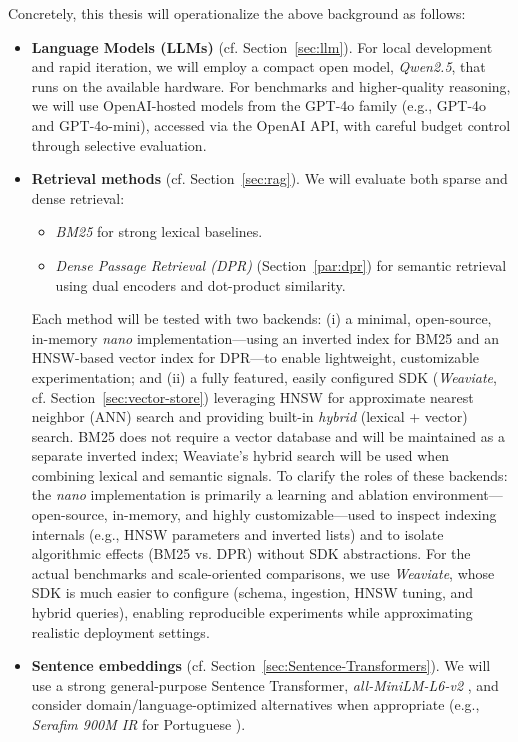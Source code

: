 Concretely, this thesis will operationalize the above background as follows:
\begin{itemize}
    \item \textbf{Language Models (\glspl{LLM})} (cf. Section~\ref{sec:llm}). For local development and rapid iteration, we will employ a compact open model, \emph{Qwen2.5}, that runs on the available hardware. For benchmarks and higher-quality reasoning, we will use OpenAI-hosted models from the GPT-4o family (e.g., GPT-4o and GPT-4o-mini), accessed via the OpenAI API, with careful budget control through selective evaluation.

    \item \textbf{Retrieval methods} (cf. Section~\ref{sec:rag}). We will evaluate both sparse and dense retrieval:
    \begin{itemize}
        \item \emph{BM25} for strong lexical baselines.
        \item \emph{Dense Passage Retrieval (DPR)} (Section~\ref{par:dpr}) for semantic retrieval using dual encoders and dot-product similarity.
    \end{itemize}
    Each method will be tested with two backends: (i) a minimal, open-source, in-memory \emph{nano} implementation---using an inverted index for BM25 and an HNSW-based vector index for DPR---to enable lightweight, customizable experimentation; and (ii) a fully featured, easily configured SDK (\emph{Weaviate}, cf. Section~\ref{sec:vector-store}) leveraging HNSW for approximate nearest neighbor (\gls{ANN}) search and providing built-in \emph{hybrid} (lexical + vector) search. BM25 does not require a vector database and will be maintained as a separate inverted index; Weaviate's hybrid search will be used when combining lexical and semantic signals.
    To clarify the roles of these backends: the \emph{nano} implementation is primarily a learning and ablation environment---open-source, in-memory, and highly customizable---used to inspect indexing internals (e.g., \gls{HNSW} parameters and inverted lists) and to isolate algorithmic effects (BM25 vs. DPR) without SDK abstractions. For the actual benchmarks and scale-oriented comparisons, we use \emph{Weaviate}, whose SDK is much easier to configure (schema, ingestion, \gls{HNSW} tuning, and hybrid queries), enabling reproducible experiments while approximating realistic deployment settings.

    \item \textbf{Sentence embeddings} (cf. Section~\ref{sec:Sentence-Transformers}). We will use a strong general-purpose Sentence Transformer, \emph{all-MiniLM-L6-v2} \cite{reimers2019sentence}, and consider domain/language-optimized alternatives when appropriate (e.g., \emph{Serafim 900M IR} for Portuguese \cite{gomes2024opensentenceembeddingsportuguese}).


\end{itemize}

